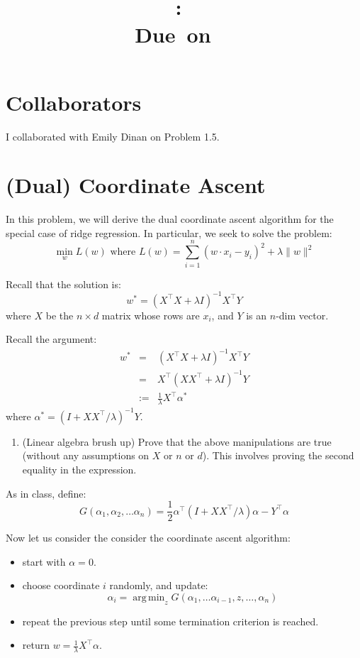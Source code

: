 \documentclass{article}
\title{
    \vspace{2in}
    \textmd{\textbf{\hmwkClass:\ \hmwkTitle}}\\
    \normalsize\vspace{0.1in}\small{Due\ on\ \hmwkDueDate\ }\\
    \vspace{3in}
}
\author{\textbf{\hmwkAuthorName}}
\date{}
\DeclareMathOperator*{\argmin}{arg\,min}
\begin{document}
\maketitle

\pagebreak

\section*{Collaborators}
I collaborated with Emily Dinan on Problem 1.5.



\section{(Dual) Coordinate Ascent}


In this problem, we will derive the dual coordinate ascent algorithm for the special case of ridge regression. In particular, we seek to solve the problem:
\[
	\min_w L(w) \textrm{ where } L(w)= \sum_{i=1}^n (w\cdot x_i - y_i)^2 + \lambda \|w\|^2
\]

Recall that the solution is:
\[
	w^* = (X^\top X+\lambda I)^{-1} X^\top Y
\]
where $X$ be the $n\times d$ matrix whose rows are $x_i$, and $Y$ is an $n$-dim vector.

Recall the argument:
\begin{eqnarray*}
	w^* & = &  (X^\top X+\lambda I)^{-1} X^\top Y\\
	 & = &  X^\top (X X^\top+\lambda I)^{-1} Y\\
	 & := &  \frac{1}{\lambda} X^\top \alpha^*
\end{eqnarray*}
where $\alpha^* = (I+XX^\top/ \lambda )^{-1} Y$.

\begin{enumerate}
	\item (Linear algebra brush up) Prove that the above manipulations are true (without any assumptions on $X$ or $n$ or $d$). This involves proving the second equality in the expression.
\end{enumerate}

As in class, define:
\[
	G(\alpha_1, \alpha_2, \ldots \alpha_n) = \frac{1}{2} \alpha^\top
	(I+XX^\top/ \lambda ) \alpha - Y^\top \alpha
\]

Now let us consider the consider the coordinate ascent algorithm:
\begin{itemize}
	\item start with $\alpha=0$.
	\item choose coordinate $i$ randomly, and update:
	\[
	\alpha_i = \argmin_z G(\alpha_1, \ldots \alpha_{i-1}, z, \ldots, \alpha_n)
	\]
	\item repeat the previous step until some termination criterion is reached.
	\item return $w =\frac{1}{\lambda} X^\top \alpha$.
\end{itemize}
\end{document}
